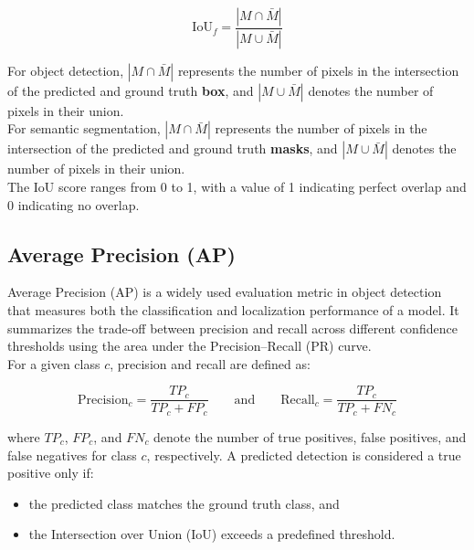 \documentclass{article}
\begin{document}
$$\text{IoU}_f = \frac{|M \cap \bar{M}|}{|M \cup \bar{M}|}$$

For object detection, \(|M \cap \bar{M}|\) represents the number of pixels in the intersection of the predicted and ground truth \textbf{box}, and \(|M \cup \bar{M}|\) denotes the number of pixels in their union. \\

For semantic segmentation, \(|M \cap \bar{M}|\) represents the number of pixels in the intersection of the predicted and ground truth \textbf{masks}, and \(|M \cup \bar{M}|\) denotes the number of pixels in their union. \\

The IoU score ranges from 0 to 1, with a value of 1 indicating perfect overlap and 0 indicating no overlap.




\subsection{Average Precision (AP)}

Average Precision (AP) \cite{mAP} is a widely used evaluation metric in object detection that measures both the classification and localization performance of a model. It summarizes the trade-off between precision and recall across different confidence thresholds using the area under the Precision--Recall (PR) curve.\\

For a given class \(c\), precision and recall are defined as:

$$
\text{Precision}_c = \frac{TP_c}{TP_c + FP_c} 
\qquad \text{and} \qquad 
\text{Recall}_c = \frac{TP_c}{TP_c + FN_c}
$$

where \(TP_c\), \(FP_c\), and \(FN_c\) denote the number of true positives, false positives, and false negatives for class \(c\), respectively. A predicted detection is considered a true positive only if:
\begin{itemize}
    \item the predicted class matches the ground truth class, and
    \item the Intersection over Union (IoU) exceeds a predefined threshold.
\end{itemize}
\end{document}

